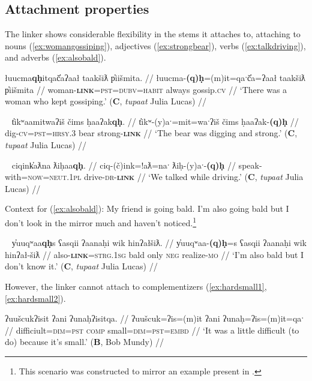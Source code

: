\subsection{Attachment properties} \label{ch:link:attach}

The linker shows considerable flexibility in the stems it attaches to, attaching to nouns (\ref{ex:womangossiping}), adjectives (\ref{ex:strongbear}), verbs (\ref{ex:talkdriving}), and adverbs (\ref{ex:alsobald}).

\ex \label{ex:womangossiping}
\begingl
\glpreamble łuucma\textbf{qḥ}itqač̓aʔaał taakšiƛ p̓iišmita. //
\gla łuucma-\textbf{(q)ḥ}=(m)it=qaˑč̓a=ʔaał taakšiƛ p̓iišmita //
\glb woman-\textbf{\textsc{link}}=\textsc{pst}=\textsc{dubv}=\textsc{habit} always gossip.\textsc{cv} //
\glft `There was a woman who kept gossiping.' (\textbf{C}, \textit{tupaat} Julia Lucas) //
\endgl
\xe

\ex~ \label{ex:strongbear}
\begingl
\glpreamble t̓ikʷaamitwaʔiš čims ḥaaʔak\textbf{qḥ}. //
\gla t̓ikʷ-(y)aˑ=mit=waˑʔiš čims ḥaaʔak-\textbf{(q)ḥ} //
\glb dig-\textsc{cv}=\textsc{pst}=\textsc{hrsy.3} bear strong-\textbf{\textsc{link}} //
\glft `The bear was digging and strong.' (\textbf{C}, \textit{tupaat} Julia Lucas) //
\endgl
\xe

\ex~ \label{ex:talkdriving}
\begingl
\glpreamble ciqink̓aƛna ƛiḥaa\textbf{qḥ}. //
\gla ciq-(č)ink=!aƛ=naˑ ƛiḥ-(y)aˑ-\textbf{(q)ḥ} //
\glb speak-with=\textsc{now}=\textsc{neut.1pl} drive-\textsc{dr}-\textbf{\textsc{link}} //
\glft `We talked while driving.' (\textbf{C}, \textit{tupaat} Julia Lucas) //
\endgl
\xe

\noindent Context for (\ref{ex:alsobald}): My friend is going bald. I'm also going bald but I don't look in the mirror much and haven't noticed.\footnote{This scenario was constructed to mirror an example present in \citet{sapir1939}.}


\ex~ \label{ex:alsobald}
\begingl
\glpreamble y̓uuqʷaa\textbf{qḥ}s ʕasqii ʔaanaḥi wik hinʔałšiƛ. //
\gla y̓uuqʷaa-\textbf{(q)ḥ}=s ʕasqii ʔaanaḥi wik hinʔał-šiƛ //
\glb also-\textbf{\textsc{link}}=\textsc{strg.1sg} bald only \textsc{neg} realize-\textsc{mo} //
\glft `I'm also bald but I don't know it.' (\textbf{C}, \textit{tupaat} Julia Lucas) //
\endgl
\xe

However, the linker cannot attach to complementizers (\ref{ex:hardsmall1}, \ref{ex:hardsmall2}).

\ex \label{ex:hardsmall1}
\begingl
\glpreamble ʔuušcukʔisit ʔani ʔunaḥʔisitqa. //
\gla ʔuušcuk=ʔis=(m)it ʔani ʔunaḥ=ʔis=(m)it=qaˑ //
\glb difficiult=\textsc{dim}=\textsc{pst} \textsc{comp} small=\textsc{dim}=\textsc{pst}=\textsc{embd} //
\glft `It was a little difficult (to do) because it's small.' (\textbf{B}, Bob Mundy) //
\endgl
\xe

